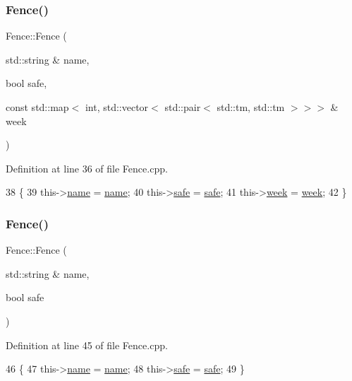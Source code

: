 \subsubsection{\texorpdfstring{Fence()}{Fence()}\hspace{0.1cm}{\footnotesize\ttfamily [1/3]}}
{\footnotesize\ttfamily Fence\+::\+Fence (\begin{DoxyParamCaption}\item[{std\+::string \&}]{name,  }\item[{bool}]{safe,  }\item[{const std\+::map$<$ int, std\+::vector$<$ std\+::pair$<$ std\+::tm, std\+::tm $>$$>$$>$ \&}]{week }\end{DoxyParamCaption})}



Definition at line 36 of file Fence.\+cpp.


\begin{DoxyCode}
38 \{
39     this->\hyperlink{class_fence_aa405676733f25812b38ea0dd9ccd1863}{name} = \hyperlink{class_fence_aa405676733f25812b38ea0dd9ccd1863}{name};
40     this->\hyperlink{class_fence_ad570430040eee657c625a67d5589c4b5}{safe} = \hyperlink{class_fence_ad570430040eee657c625a67d5589c4b5}{safe};
41     this->\hyperlink{class_fence_ae589e973fa03316847aeceedd72e2b64}{week} = \hyperlink{class_fence_ae589e973fa03316847aeceedd72e2b64}{week};
42 \}
\end{DoxyCode}
\mbox{\label{class_fence_ae67f4594ce0f96eda5cb02df41fcf45a}} 
\subsubsection{\texorpdfstring{Fence()}{Fence()}\hspace{0.1cm}{\footnotesize\ttfamily [2/3]}}
{\footnotesize\ttfamily Fence\+::\+Fence (\begin{DoxyParamCaption}\item[{std\+::string \&}]{name,  }\item[{bool}]{safe }\end{DoxyParamCaption})}



Definition at line 45 of file Fence.\+cpp.


\begin{DoxyCode}
46 \{
47     this->\hyperlink{class_fence_aa405676733f25812b38ea0dd9ccd1863}{name} = \hyperlink{class_fence_aa405676733f25812b38ea0dd9ccd1863}{name};
48     this->\hyperlink{class_fence_ad570430040eee657c625a67d5589c4b5}{safe} = \hyperlink{class_fence_ad570430040eee657c625a67d5589c4b5}{safe};
49 \}
\end{DoxyCode}
\mbox{\label{class_fence_a3fdfc7240f1e938dab4c9534c63aa427}} 
